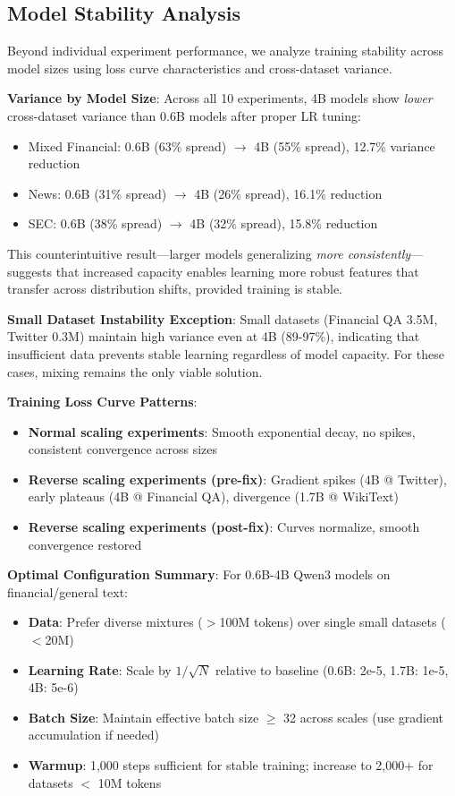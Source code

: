 \subsection{Model Stability Analysis}

Beyond individual experiment performance, we analyze training stability across model sizes using loss curve characteristics and cross-dataset variance.

\textbf{Variance by Model Size}: Across all 10 experiments, 4B models show \textit{lower} cross-dataset variance than 0.6B models after proper LR tuning:
\begin{itemize}
\item Mixed Financial: 0.6B (63\% spread) $\to$ 4B (55\% spread), 12.7\% variance reduction
\item News: 0.6B (31\% spread) $\to$ 4B (26\% spread), 16.1\% reduction
\item SEC: 0.6B (38\% spread) $\to$ 4B (32\% spread), 15.8\% reduction
\end{itemize}

This counterintuitive result---larger models generalizing \textit{more consistently}---suggests that increased capacity enables learning more robust features that transfer across distribution shifts, provided training is stable.

\textbf{Small Dataset Instability Exception}: Small datasets (Financial QA 3.5M, Twitter 0.3M) maintain high variance even at 4B (89-97\%), indicating that insufficient data prevents stable learning regardless of model capacity. For these cases, mixing remains the only viable solution.

\textbf{Training Loss Curve Patterns}:
\begin{itemize}
\item \textbf{Normal scaling experiments}: Smooth exponential decay, no spikes, consistent convergence across sizes
\item \textbf{Reverse scaling experiments (pre-fix)}: Gradient spikes (4B @ Twitter), early plateaus (4B @ Financial QA), divergence (1.7B @ WikiText)
\item \textbf{Reverse scaling experiments (post-fix)}: Curves normalize, smooth convergence restored
\end{itemize}

\textbf{Optimal Configuration Summary}: For 0.6B-4B Qwen3 models on financial/general text:
\begin{itemize}
\item \textbf{Data}: Prefer diverse mixtures ($>$100M tokens) over single small datasets ($<$20M)
\item \textbf{Learning Rate}: Scale by $1/\sqrt{N}$ relative to baseline (0.6B: 2e-5, 1.7B: 1e-5, 4B: 5e-6)
\item \textbf{Batch Size}: Maintain effective batch size $\geq$ 32 across scales (use gradient accumulation if needed)
\item \textbf{Warmup}: 1,000 steps sufficient for stable training; increase to 2,000+ for datasets $<$ 10M tokens
\end{itemize}


